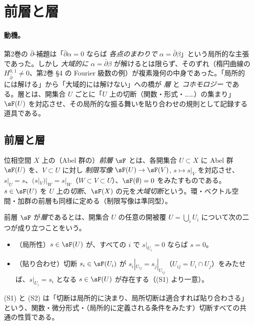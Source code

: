 \section{前層と層}\label{sec:sheaf}

\paragraph{動機。}第2巻の $\bar\partial$-補題は「$\bar\partial\alpha=0$ ならば \emph{各点のまわりで} $\alpha=\bar\partial\beta$」という局所的な主張であった。しかし \emph{大域的に} $\alpha=\bar\partial\beta$ が解けるとは限らず、そのずれ（楕円曲線の $H^{0,1}_{\bar\partial}\ne0$、第2巻 §4 の Fourier 級数の例）が複素幾何の中身であった。「局所的には解ける」から「大域的には解けない」への橋が \emph{層} と \emph{コホモロジー} である。層とは、開集合 $U$ ごとに「$U$ 上の切断（関数・形式・……）の集まり」$\sF(U)$ を対応させ、その局所的な振る舞いを貼り合わせの規則として記録する道具である。

\subsection{前層と層}
\begin{defn}[前層]
位相空間 $X$ 上の（Abel 群の）\emph{前層} $\sF$ とは、各開集合 $U\subset X$ に Abel 群 $\sF(U)$ を、$V\subset U$ に対し \emph{制限写像} $\sF(U)\to\sF(V)$, $s\mapsto s|_V$ を対応させ、$s|_U=s$、$(s|_V)|_W=s|_W$（$W\subset V\subset U$）、$\sF(\emptyset)=0$ をみたすものである。$s\in\sF(U)$ を $U$ 上の\emph{切断}、$\sF(X)$ の元を\emph{大域切断}という。環・ベクトル空間・加群の前層も同様に定める（制限写像は準同型）。
\end{defn}
\begin{defn}[層]
前層 $\sF$ が\emph{層}であるとは、開集合 $U$ の任意の開被覆 $U=\bigcup_iU_i$ について次の二つが成り立つことをいう。
\begin{itemize}
\item[(S1)]（局所性）$s\in\sF(U)$ が、すべての $i$ で $s|_{U_i}=0$ ならば $s=0$。
\item[(S2)]（貼り合わせ）切断 $s_i\in\sF(U_i)$ が $s_i|_{U_{ij}}=s_j|_{U_{ij}}$（$U_{ij}=U_i\cap U_j$）をみたせば、$s|_{U_i}=s_i$ となる $s\in\sF(U)$ が存在する（(S1) より一意）。
\end{itemize}
\end{defn}
(S1) と (S2) は「切断は局所的に決まり、局所切断は適合すれば貼り合わさる」という、関数・微分形式・（局所的に定義される条件をみたす）切断すべての共通の性質である。

